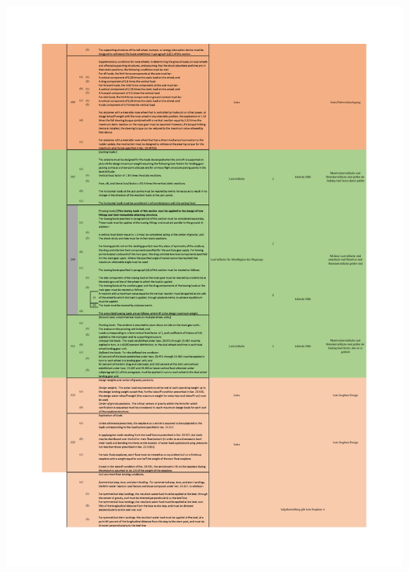 \begin{table}[H]
\centering
\includegraphics[width=1.0\textwidth, trim={19mm 19mm 19mm 19mm}, clip]{bilder/Tabellen/MPP_Konstruktion_8.pdf}
\end{table}

